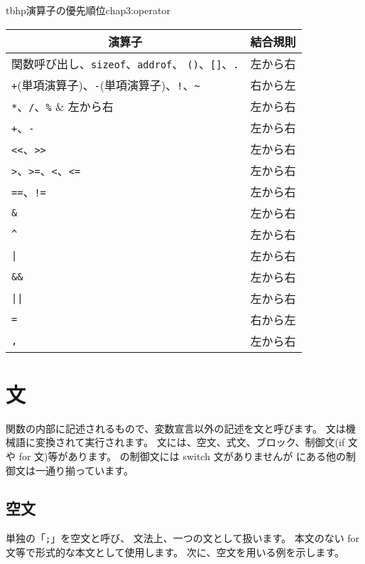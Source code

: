 \begin{mytable}{tbhp}{演算子の優先順位}{chap3:operator}
\begin{tabular}{l|l}
\hline
\multicolumn{1}{c}{演算子} & \multicolumn{1}{|c}{結合規則} \\
\hline
関数呼び出し、\verb/sizeof/、\verb/addrof/、
\verb/()/、\verb/[]/、\verb/./ & 左から右 \\
\verb/+/(単項演算子)、\verb/-/(単項演算子)、\verb/!/、\verb/~/ & 右から左 \\
\verb/*/、\verb!/!、\verb/%/             & 左から右 \\
\verb/+/、\verb/-/                       & 左から右 \\
\verb/<</、\verb/>>/                     & 左から右 \\
\verb/>/、\verb/>=/、\verb/</、\verb/<=/ & 左から右 \\
\verb/==/、\verb/!=/                     & 左から右 \\
\verb/&/                                 & 左から右 \\
\verb/^/                                 & 左から右 \\
\verb/|/                                 & 左から右 \\
\verb/&&/                                & 左から右 \\
\verb/||/                                & 左から右 \\
\verb/=/                                 & 右から左 \\
\verb/,/                                 & 左から右 \\
\end{tabular}
\end{mytable}

\section{文}

関数の内部に記述されるもので、変数宣言以外の記述を文と呼びます。
文は機械語に変換されて実行されます。
文には、空文、式文、ブロック、制御文(if 文や for 文)等があります。
\cmml の制御文には switch 文がありませんが
\cl にある他の制御文は一通り揃っています。

\subsection{空文}

単独の「\verb/;/」を空文と呼び、
文法上、一つの文として扱います。
本文のない for 文等で形式的な本文として使用します。
次に、空文を用いる例を示します。


